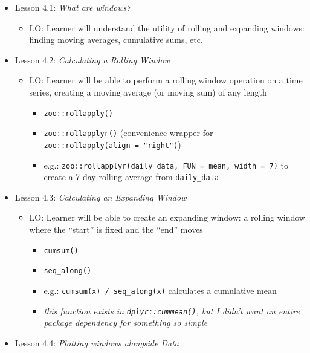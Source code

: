 \documentclass[
]{book}
\providecommand{\tightlist}{%
  \setlength{\itemsep}{0pt}\setlength{\parskip}{0pt}}
\begin{document}
\begin{itemize}
\tightlist
\item
  Lesson 4.1: \emph{What are windows?}

  \begin{itemize}
  \tightlist
  \item
    LO: Learner will understand the utility of rolling and expanding windows: finding moving averages, cumulative sums, etc.
  \end{itemize}
\item
  Lesson 4.2: \emph{Calculating a Rolling Window}

  \begin{itemize}
  \tightlist
  \item
    LO: Learner will be able to perform a rolling window operation on a time series, creating a moving average (or moving sum) of any length

    \begin{itemize}
    \tightlist
    \item
      \texttt{zoo::rollapply()}
    \item
      \texttt{zoo::rollapplyr()} (convenience wrapper for \texttt{zoo::rollapply(align\ =\ "right")})
    \item
      e.g.: \texttt{zoo::rollapplyr(daily\_data,\ FUN\ =\ mean,\ width\ =\ 7)} to create a 7-day rolling average from \texttt{daily\_data}
    \end{itemize}
  \end{itemize}
\item
  Lesson 4.3: \emph{Calculating an Expanding Window}

  \begin{itemize}
  \tightlist
  \item
    LO: Learner will be able to create an expanding window: a rolling window where the ``start'' is fixed and the ``end'' moves

    \begin{itemize}
    \tightlist
    \item
      \texttt{cumsum()}
    \item
      \texttt{seq\_along()}
    \item
      e.g.: \texttt{cumsum(x)\ /\ seq\_along(x)} calculates a cumulative mean
    \item
      \emph{this function exists in \texttt{dplyr::cummean()}, but I didn't want an entire package dependency for something so simple}
    \end{itemize}
  \end{itemize}
\item
  Lesson 4.4: \emph{Plotting windows alongside Data}


\end{itemize}
\end{document}
